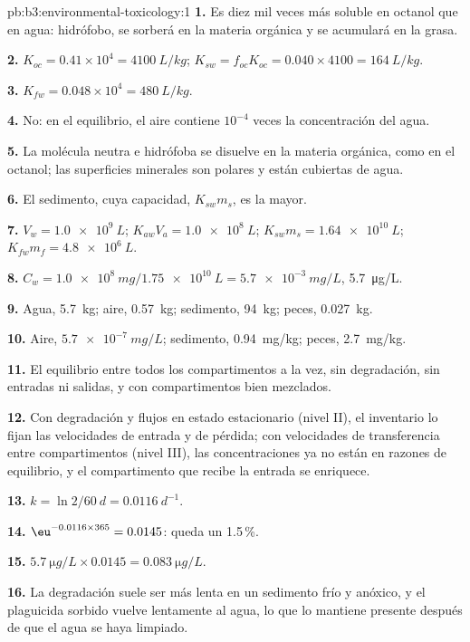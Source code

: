 \begin{solution}{pb:b3:environmental-toxicology:1}
\textbf{1.} Es diez mil veces más soluble en octanol que en agua: hidrófobo,
se sorberá en la materia orgánica y se acumulará en la grasa.

\textbf{2.} $K_{oc} = 0.41 \times 10^4 = \qty{4100}{L/kg}$; $K_{sw} = f_{oc}K_{oc} = 0.040 \times 4100 = \qty{164}{L/kg}$.

\textbf{3.} $K_{fw} = 0.048 \times 10^4 = \qty{480}{L/kg}$.

\textbf{4.} No: en el equilibrio, el aire contiene $10^{-4}$ veces la concentración del agua.

\textbf{5.} La molécula neutra e hidrófoba se disuelve en la materia orgánica, como en el
octanol; las superficies minerales son polares y están cubiertas de agua.

\textbf{6.} El sedimento, cuya capacidad, $K_{sw}m_s$, es la mayor.

\textbf{7.} $V_w = \qty{1.0e9}{L}$; $K_{aw}V_a = \qty{1.0e8}{L}$; $K_{sw}m_s = \qty{1.64e10}{L}$; $K_{fw}m_f = \qty{4.8e6}{L}$.

\textbf{8.} $C_w = \qty{1.0e8}{mg}/\qty{1.75e10}{L} = \qty{5.7e-3}{mg/L}$, \qty{5.7}{\micro g/L}.

\textbf{9.} Agua, \qty{5.7}{kg}; aire, \qty{0.57}{kg}; sedimento, \qty{94}{kg}; peces, \qty{0.027}{kg}.

\textbf{10.} Aire, $\qty{5.7e-7}{mg/L}$; sedimento, \qty{0.94}{mg/kg}; peces, \qty{2.7}{mg/kg}.

\textbf{11.} El equilibrio entre todos los compartimentos a la vez, sin degradación, sin
entradas ni salidas, y con compartimentos bien mezclados.

\textbf{12.} Con degradación y flujos en estado estacionario (nivel II), el inventario lo fijan
las velocidades de entrada y de pérdida; con velocidades de transferencia entre compartimentos (nivel III),
las concentraciones ya no están en razones de equilibrio, y el compartimento que
recibe la entrada se enriquece.

\textbf{13.} $k = \ln 2/\qty{60}{d} = \qty{0.0116}{d^{-1}}$.

\textbf{14.} $\eu^{-0.0116 \times 365} = 0.0145$: queda un 1.5\,\%.

\textbf{15.} $\qty{5.7}{\micro g/L} \times 0.0145 = \qty{0.083}{\micro g/L}$.

\textbf{16.} La degradación suele ser más lenta en un sedimento frío y anóxico, y el plaguicida
sorbido vuelve lentamente al agua, lo que lo mantiene presente después de que el
agua se haya limpiado.


\end{solution}
